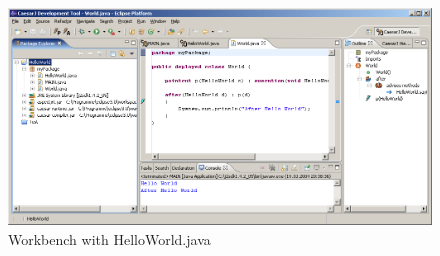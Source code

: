 \begin{figure}[htbp]
	\centering
		\includegraphics[width=1.0\textwidth]{images/workspace_newclass.png}
	\caption{Workbench with HelloWorld.java}
	\label{fig:workspace_newclass}
\end{figure}
